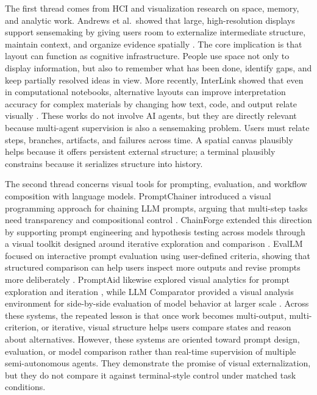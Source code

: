 \documentclass[sigconf]{acmart}
\begin{document}
The first thread comes from HCI and visualization research on space, memory, and analytic work. Andrews et al.\ showed that large, high-resolution displays support sensemaking by giving users room to externalize intermediate structure, maintain context, and organize evidence spatially \cite{andrews2010space}. The core implication is that layout can function as cognitive infrastructure. People use space not only to display information, but also to remember what has been done, identify gaps, and keep partially resolved ideas in view. More recently, InterLink showed that even in computational notebooks, alternative layouts can improve interpretation accuracy for complex materials by changing how text, code, and output relate visually \cite{lin2025interlink}. These works do not involve AI agents, but they are directly relevant because multi-agent supervision is also a sensemaking problem. Users must relate steps, branches, artifacts, and failures across time. A spatial canvas plausibly helps because it offers persistent external structure; a terminal plausibly constrains because it serializes structure into history.

The second thread concerns visual tools for prompting, evaluation, and workflow composition with language models. PromptChainer introduced a visual programming approach for chaining LLM prompts, arguing that multi-step tasks need transparency and compositional control \cite{wu2022promptchainer}. ChainForge extended this direction by supporting prompt engineering and hypothesis testing across models through a visual toolkit designed around iterative exploration and comparison \cite{arawjo2024chainforge}. EvalLM focused on interactive prompt evaluation using user-defined criteria, showing that structured comparison can help users inspect more outputs and revise prompts more deliberately \cite{kim2024evallm}. PromptAid likewise explored visual analytics for prompt exploration and iteration \cite{mishra2025promptaid}, while LLM Comparator provided a visual analysis environment for side-by-side evaluation of model behavior at larger scale \cite{kahng2025llmcomparator}. Across these systems, the repeated lesson is that once work becomes multi-output, multi-criterion, or iterative, visual structure helps users compare states and reason about alternatives. However, these systems are oriented toward prompt design, evaluation, or model comparison rather than real-time supervision of multiple semi-autonomous agents. They demonstrate the promise of visual externalization, but they do not compare it against terminal-style control under matched task conditions.
\end{document}
